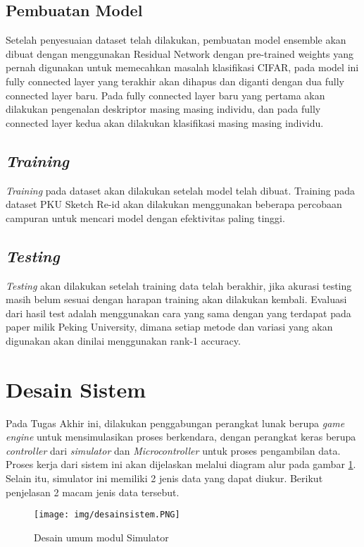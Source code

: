 	\subsection{Pembuatan Model}
	Setelah penyesuaian dataset telah dilakukan, pembuatan model ensemble akan dibuat dengan menggunakan Residual Network dengan pre-trained weights yang pernah digunakan untuk memecahkan masalah klasifikasi CIFAR, pada model ini fully connected layer yang terakhir akan dihapus dan diganti dengan dua fully connected layer baru. Pada fully connected layer baru yang pertama akan dilakukan pengenalan deskriptor masing masing individu, dan pada fully connected layer kedua akan dilakukan klasifikasi masing masing individu.

	\subsection{\textit{Training}}
	\textit{Training} pada dataset akan dilakukan setelah model telah dibuat. Training pada dataset PKU Sketch Re-id akan dilakukan menggunakan beberapa percobaan campuran untuk mencari model dengan efektivitas paling tinggi.
	
	\subsection{\textit{Testing}}
	\textit{Testing} akan dilakukan setelah training data telah berakhir, jika akurasi testing masih belum sesuai dengan harapan training akan dilakukan kembali. Evaluasi dari hasil test adalah menggunakan cara yang sama dengan yang terdapat pada paper milik Peking University\cite{cit:12}, dimana setiap metode dan variasi yang akan digunakan akan dinilai menggunakan rank-1 accuracy.
	
\pagebreak


\section{Desain Sistem}
\vspace{1ex}
	Pada Tugas Akhir ini, dilakukan penggabungan perangkat lunak berupa \textit{game engine} untuk mensimulasikan proses berkendara, dengan perangkat keras berupa \textit{controller} dari \textit{simulator} dan \textit{Microcontroller} untuk proses pengambilan data. Proses kerja dari sistem ini akan dijelaskan melalui diagram alur pada gambar \ref{fig: 3_2}.
	Selain itu, simulator ini memiliki 2 jenis data yang dapat diukur. Berikut penjelasan 2 macam jenis data tersebut.
\begin{figure}  [!htb]
	\captionsetup{justification=centering}
	\texttt{[image: img/desainsistem.PNG]}
	\caption{Desain umum modul Simulator}
	\label{fig: 3_2}
\end{figure}
\vspace{1ex}

